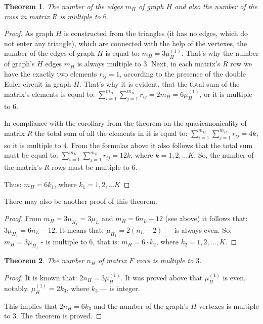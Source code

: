 \documentclass{amsart}
\newtheorem{theorem}{Theorem}
\theoremstyle{plain}
\numberwithin{equation}{section}
\begin{document}
\begin {theorem} \label{MatrixRedges}
The number of the edges $m_H$ of graph $H$ and also the number of the rows in matrix $R$ is multiple to $6$.
\end {theorem}

\begin {proof}
As graph $H$ is constructed from the triangles (it has no edges, which do not enter any triangle), which are connected with the help of the vertexes, the number of the edges of graph $H$ is equal to: $m_H=3\mu_H^{(1)}$. That's why the number of graph's $H$ edges $m_H$ is always multiple to 3. Next, in each matrix's $R$ row we have the exactly two elements $r_{ij}=1$, according to the presence of the double Euler circuit in graph $H$. That's why it is evident, that the total sum of the matrix's elements is equal to: $\sum_{i=1}^{m_H}\sum_{j=1}^{m_H}r_{ij}=2m_H=6\mu_H^{(1)}$, or it is multiple to $6$.

In compliance with the corollary from the theorem on the quasicanonicality of matrix $R$ the total sum of all the elements in it is equal to: $\sum_{i=1}^{m_H}\sum_{j=1}^{m_H}r_{ij}=4k$, so it is multiple to $4$. From the formulas above it also follows that the total sum must be equal to: $\sum_{i=1}^{m_H}\sum_{j=1}^{m_H}r_{ij}=12k$, where $k=1,2,...K$. So, the number of the matrix's $R$ rows must be multiple to $6$.

Thus: $m_H=6k_1$, where $k_1=1,2,...K$
\end {proof}

There may also be another proof of this theorem.

\begin {proof}
From $m_H=3\mu_{H_1 }=3\mu_L$ and $m_H=6n_L-12$ (see above) it follows that: $3\mu_{H_1 }=6n_L-12$. It means that: $\mu_{H_1 }=2(n_L-2)$ --- is always even. So: $m_H=3\mu_{H_1}$ - is multiple to $6$, that is: $m_H=6\cdot k_2$, where $k_2=1,2,...,K$.
\end {proof}

\begin {theorem} \label{MatrixFrows}
The number $n_H$ of matrix $F$ rows is multiple to $3$.
\end {theorem}

\begin {proof}
It is known that: $2n_H=3\mu_H^{(1)}$. It was proved above that $\mu_H^{(1)}$ is even, notably, $\mu_H^{(1)}=2k_3$, where $k_3$ --- is integer.
 
This implies that $2n_H=6k_3$ and the number of the graph's $H$ vertexes is multiple to $3$. The theorem is proved.
\end {proof}
\end{document}
